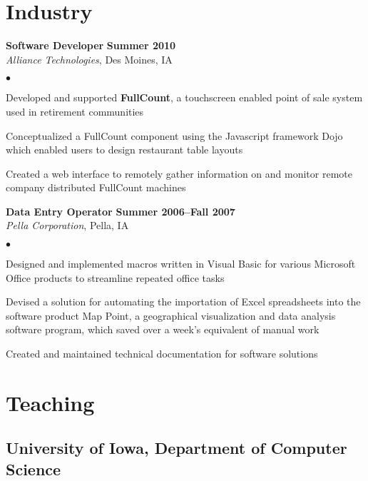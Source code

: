 \documentclass[10pt,letterpaper]{article}
\renewenvironment{itemize}{
  \begin{list}{}{
      \setlength{\leftmargin}{1.5em}
      \setlength{\itemsep}{0.25em}
      \setlength{\parskip}{0pt}
      \setlength{\parsep}{0.25em}
    }
  }{
  \end{list}
}
\newenvironment{bitemize}{
  \begin{list}{$\bullet$}{
      \setlength{\leftmargin}{1.5em}
      \setlength{\itemsep}{0.25em}
      \setlength{\parskip}{0pt}
      \setlength{\parsep}{0.25em}
    }
  }{
  \end{list}
}
\begin{document}
\section*{Industry}
\begin{itemize}
\item \textbf{Software Developer} \hfill \textbf{Summer 2010}\\
  \textit{Alliance Technologies}, Des Moines, IA
  \begin{bitemize}
  \item Developed and supported \textbf{FullCount}, a touchscreen
    enabled point of sale system used in retirement communities
  \item Conceptualized a FullCount component using the Javascript
    framework Dojo which enabled users to design restaurant table
    layouts
  \item Created a web interface to remotely gather information on and
    monitor remote company distributed FullCount machines
  \end{bitemize}

\item \textbf{Data Entry Operator} \hfill \textbf{Summer 2006--Fall 2007}\\
  \textit{Pella Corporation}, Pella, IA
  \begin{bitemize}
  \item Designed and implemented macros written in Visual Basic
    for various Microsoft Office products to streamline repeated
    office tasks %
  \item Devised a solution for automating the importation of Excel
    spreadsheets into the software product Map Point, a geographical
    visualization and data analysis software program, which saved over
    a week's equivalent of manual work
  \item Created and maintained technical documentation for software
    solutions
  \end{bitemize}
\end{itemize}

\section*{Teaching}

\subsection*{University of Iowa, Department of Computer Science}
\end{document}
